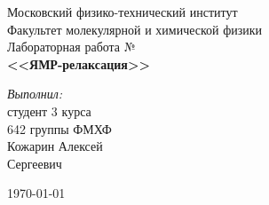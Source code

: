 \begin{titlepage}
\begin{center} 
 
\large Московский физико-технический институт\\
Факультет молекулярной и химической физики\\
\vspace{7cm}
\huge Лабораторная работа №\\
\textbf{\Large <<ЯМР-релаксация>>}\\
\end{center} 

\vspace{7.5cm}
{\par \raggedleft \large \emph{Выполнил:}\\ студент 3 курса\\ 642 группы ФМХФ\\ Кожарин Алексей\\ Сергеевич \par}
\begin{center}
\vfill \today
\date \today
\end{center}
\end{titlepage}
\newpage
